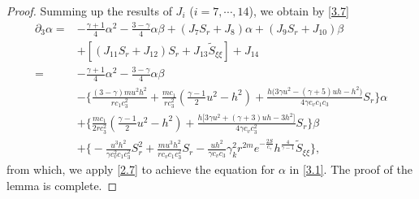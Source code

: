 \documentclass[10pt,a4paper]{amsart}
\begin{document}
\begin{proof}
Summing up the results of $J_{i}$ ($i=7,\cdots,14$), we obtain by \eqref{3.7}
\begin{align*}
\partial_3 \alpha =&-\frac{\gamma+1}{4}\alpha^{2}
- \frac{3-\gamma}{4}\alpha\beta +(J_7 S_{r} +J_8)\alpha +(J_9 S_r +J_{10})\beta \\
&+[(J_{11}S_{r}  +J_{12})S_r +J_{13}\widetilde{S}_{\xi\xi}]  +J_{14} \\
=&-\frac{\gamma+1}{4}\alpha^{2}
- \frac{3-\gamma}{4}\alpha\beta \\
&-\bigg\{\frac{(3-\gamma) m u^2 h^2}{r c_1 c_3^2}+ \frac{m c_1}{r c_3^2}\left( \frac{\gamma-1}{2}u^{2} - h^{2} \right)
 + \frac{h\big(3\gamma u^2 - (\gamma+5)u h - h^2\big)}{4\gamma c_v c_1 c_3} S_r\bigg\}\alpha \\
& +\bigg\{\frac{mc_1}{2r c_3^2} \left( \frac{\gamma-1}{2}u^{2} - h^{2} \right)
+ \frac{h\big[3\gamma u^2+(\gamma+3)u h-3h^2\big]}{4\gamma c_v c_3^2 } S_r\bigg\}\beta \\ &+\bigg\{-\frac{u^3 h^2}{\gamma c_v^2 c_1 c_3^2}S_r^2
+ \frac{mu^3 h^2}{r c_v c_1 c_3^2} S_r
- \frac{u h^2}{\gamma c_v c_3}\gamma_k^2 r^{2m} e^{-\frac{2S}{c_\gamma}} h^{\frac{4}{\gamma-1}} \widetilde{S}_{\xi\xi}\bigg\},
\end{align*}
from which, we apply \eqref{2.7} to achieve the equation for $\alpha$ in \eqref{3.1}. The proof of the lemma is complete.
\end{proof}
\end{document}
